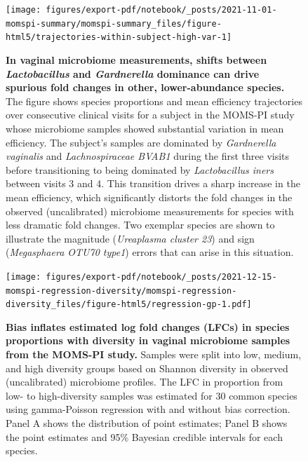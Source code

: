\documentclass[
]{article}
\begin{document}
\begin{figure}
\texttt{[image: figures/export-pdf/notebook/\_posts/2021-11-01-momspi-summary/momspi-summary\_files/figure-html5/trajectories-within-subject-high-var-1]} \caption{\textbf{In vaginal microbiome measurements, shifts between \emph{Lactobacillus} and \emph{Gardnerella} dominance can drive spurious fold changes in other, lower-abundance species.} The figure shows species proportions and mean efficiency trajectories over consecutive clinical visits for a subject in the MOMS-PI study whose microbiome samples showed substantial variation in mean efficiency. The subject's samples are dominated by \emph{Gardnerella vaginalis} and \emph{Lachnospiraceae BVAB1} during the first three visits before transitioning to being dominated by \emph{Lactobacillus iners} between visits 3 and 4. This transition drives a sharp increase in the mean efficiency, which significantly distorts the fold changes in the observed (uncalibrated) microbiome measurements for species with less dramatic fold changes. Two exemplar species are shown to illustrate the magnitude (\emph{Ureaplasma cluster 23}) and sign (\emph{Megasphaera OTU70 type1}) errors that can arise in this situation.}\label{fig:momspi-trajectory}
\end{figure}



\begin{figure}
\centering
\texttt{[image: figures/export-pdf/notebook/\_posts/2021-12-15-momspi-regression-diversity/momspi-regression-diversity\_files/figure-html5/regression-gp-1.pdf]}
\caption{\label{fig:momspi-regression}\textbf{Bias inflates estimated log fold changes (LFCs) in species proportions with diversity in vaginal microbiome samples from the MOMS-PI study.} Samples were split into low, medium, and high diversity groups based on Shannon diversity in observed (uncalibrated) microbiome profiles. The LFC in proportion from low- to high-diversity samples was estimated for 30 common species using gamma-Poisson regression with and without bias correction. Panel A shows the distribution of point estimates; Panel B shows the point estimates and 95\% Bayesian credible intervals for each species.}
\end{figure}
\end{document}
